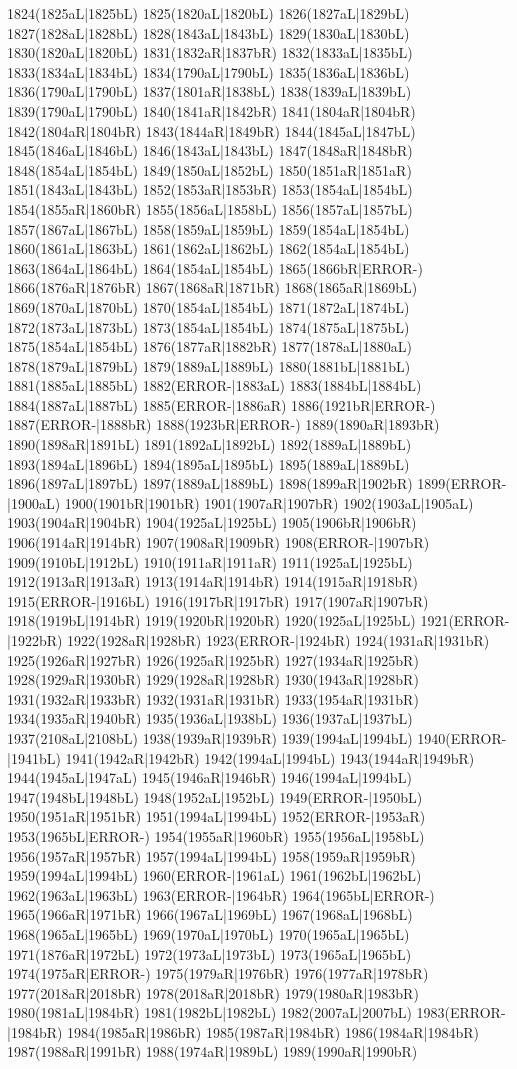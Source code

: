 1824(1825aL|1825bL) 1825(1820aL|1820bL) 1826(1827aL|1829bL) 1827(1828aL|1828bL) 1828(1843aL|1843bL) 1829(1830aL|1830bL) 1830(1820aL|1820bL) 1831(1832aR|1837bR) 1832(1833aL|1835bL) 1833(1834aL|1834bL) 1834(1790aL|1790bL) 1835(1836aL|1836bL) 1836(1790aL|1790bL) 1837(1801aR|1838bL) 1838(1839aL|1839bL) 1839(1790aL|1790bL) 1840(1841aR|1842bR) 1841(1804aR|1804bR) 1842(1804aR|1804bR) 1843(1844aR|1849bR) 1844(1845aL|1847bL) 1845(1846aL|1846bL) 1846(1843aL|1843bL) 1847(1848aR|1848bR) 1848(1854aL|1854bL) 1849(1850aL|1852bL) 1850(1851aR|1851aR) 1851(1843aL|1843bL) 1852(1853aR|1853bR) 1853(1854aL|1854bL) 1854(1855aR|1860bR) 1855(1856aL|1858bL) 1856(1857aL|1857bL) 1857(1867aL|1867bL) 1858(1859aL|1859bL) 1859(1854aL|1854bL) 1860(1861aL|1863bL) 1861(1862aL|1862bL) 1862(1854aL|1854bL) 1863(1864aL|1864bL) 1864(1854aL|1854bL) 1865(1866bR|ERROR-) 1866(1876aR|1876bR) 1867(1868aR|1871bR) 1868(1865aR|1869bL) 1869(1870aL|1870bL) 1870(1854aL|1854bL) 1871(1872aL|1874bL) 1872(1873aL|1873bL) 1873(1854aL|1854bL) 1874(1875aL|1875bL) 1875(1854aL|1854bL) 1876(1877aR|1882bR) 1877(1878aL|1880aL) 1878(1879aL|1879bL) 1879(1889aL|1889bL) 1880(1881bL|1881bL) 1881(1885aL|1885bL) 1882(ERROR-|1883aL) 1883(1884bL|1884bL) 1884(1887aL|1887bL) 1885(ERROR-|1886aR) 1886(1921bR|ERROR-) 1887(ERROR-|1888bR) 1888(1923bR|ERROR-) 1889(1890aR|1893bR) 1890(1898aR|1891bL) 1891(1892aL|1892bL) 1892(1889aL|1889bL) 1893(1894aL|1896bL) 1894(1895aL|1895bL) 1895(1889aL|1889bL) 1896(1897aL|1897bL) 1897(1889aL|1889bL) 1898(1899aR|1902bR) 1899(ERROR-|1900aL) 1900(1901bR|1901bR) 1901(1907aR|1907bR) 1902(1903aL|1905aL) 1903(1904aR|1904bR) 1904(1925aL|1925bL) 1905(1906bR|1906bR) 1906(1914aR|1914bR) 1907(1908aR|1909bR) 1908(ERROR-|1907bR) 1909(1910bL|1912bL) 1910(1911aR|1911aR) 1911(1925aL|1925bL) 1912(1913aR|1913aR) 1913(1914aR|1914bR) 1914(1915aR|1918bR) 1915(ERROR-|1916bL) 1916(1917bR|1917bR) 1917(1907aR|1907bR) 1918(1919bL|1914bR) 1919(1920bR|1920bR) 1920(1925aL|1925bL) 1921(ERROR-|1922bR) 1922(1928aR|1928bR) 1923(ERROR-|1924bR) 1924(1931aR|1931bR) 1925(1926aR|1927bR) 1926(1925aR|1925bR) 1927(1934aR|1925bR) 1928(1929aR|1930bR) 1929(1928aR|1928bR) 1930(1943aR|1928bR) 1931(1932aR|1933bR) 1932(1931aR|1931bR) 1933(1954aR|1931bR) 1934(1935aR|1940bR) 1935(1936aL|1938bL) 1936(1937aL|1937bL) 1937(2108aL|2108bL) 1938(1939aR|1939bR) 1939(1994aL|1994bL) 1940(ERROR-|1941bL) 1941(1942aR|1942bR) 1942(1994aL|1994bL) 1943(1944aR|1949bR) 1944(1945aL|1947aL) 1945(1946aR|1946bR) 1946(1994aL|1994bL) 1947(1948bL|1948bL) 1948(1952aL|1952bL) 1949(ERROR-|1950bL) 1950(1951aR|1951bR) 1951(1994aL|1994bL) 1952(ERROR-|1953aR) 1953(1965bL|ERROR-) 1954(1955aR|1960bR) 1955(1956aL|1958bL) 1956(1957aR|1957bR) 1957(1994aL|1994bL) 1958(1959aR|1959bR) 1959(1994aL|1994bL) 1960(ERROR-|1961aL) 1961(1962bL|1962bL) 1962(1963aL|1963bL) 1963(ERROR-|1964bR) 1964(1965bL|ERROR-) 1965(1966aR|1971bR) 1966(1967aL|1969bL) 1967(1968aL|1968bL) 1968(1965aL|1965bL) 1969(1970aL|1970bL) 1970(1965aL|1965bL) 1971(1876aR|1972bL) 1972(1973aL|1973bL) 1973(1965aL|1965bL) 1974(1975aR|ERROR-) 1975(1979aR|1976bR) 1976(1977aR|1978bR) 1977(2018aR|2018bR) 1978(2018aR|2018bR) 1979(1980aR|1983bR) 1980(1981aL|1984bR) 1981(1982bL|1982bL) 1982(2007aL|2007bL) 1983(ERROR-|1984bR) 1984(1985aR|1986bR) 1985(1987aR|1984bR) 1986(1984aR|1984bR) 1987(1988aR|1991bR) 1988(1974aR|1989bL) 1989(1990aR|1990bR) 
